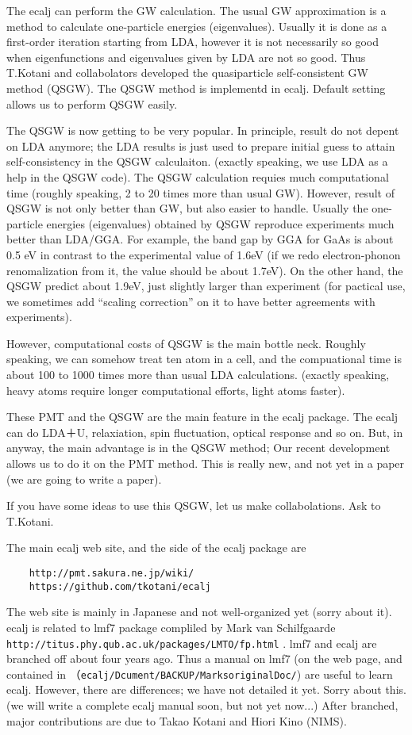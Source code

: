 \documentclass[a4paper,10pt,epsf,fleqn]{article}
\begin{document}
The ecalj can perform the GW calculation. 
The usual GW approximation is a method to calculate
one-particle energies (eigenvalues). Usually it is done as a
first-order iteration starting from LDA, however it is not necessarily
so good when eigenfunctions and eigenvalues given by LDA are not
so good. Thus T.Kotani and collabolators developed the 
quasiparticle self-consistent GW method (QSGW). The QSGW method is
implementd in ecalj. Default setting allows us to perform QSGW easily.

The QSGW is now getting to be very popular. In principle,
result do not depent on LDA anymore; the LDA results is just used to
prepare initial guess to attain
self-consistency in the QSGW calculaiton. (exactly speaking, we use
LDA as a help in the QSGW code). 
The QSGW calculation requies much computational time 
(roughly speaking, 2 to 20 times more than usual GW).
However, result of QSGW is not only better than GW, but also easier to handle.
Usually the one-particle energies (eigenvalues) obtained by QSGW
reproduce experiments much better than LDA/GGA.
For example, the band gap by GGA for GaAs is about 0.5 eV in contrast
to the experimental value of 1.6eV (if we redo electron-phonon
renomalization from it, the value should be about 1.7eV). 
On the other hand, the QSGW predict about 1.9eV, just slightly larger
than experiment (for pactical use, we sometimes add 
``scaling correction'' on it to have better agreements with experiments).

However, computational costs of QSGW is the main bottle neck. 
Roughly speaking, we can somehow treat ten atom in a cell, and the compuational time
is about 100 to 1000 times more than usual LDA calculations.
(exactly speaking, heavy atoms require longer computational efforts,
light atoms faster).

These PMT and the QSGW are the main feature in the ecalj package.
The ecalj can do LDA＋U, relaxiation, spin fluctuation, optical response and so on.
But, in anyway, the main advantage is in the QSGW method; Our recent
development  allows us to do it on the PMT method. 
This is really new, and not yet in a paper (we are going to write a
paper).

If you have some ideas to use this QSGW, let us make
collabolations. Ask to T.Kotani.

The main ecalj web site, and the side of the ecalj package are
\begin{verbatim}
    http://pmt.sakura.ne.jp/wiki/
    https://github.com/tkotani/ecalj
\end{verbatim}
The web site is mainly in Japanese and not well-organized yet (sorry
about it). ecalj is related to lmf7 package compliled by Mark van Schilfgaarde\\
\verb+http://titus.phy.qub.ac.uk/packages/LMTO/fp.html+
. lmf7 and ecalj are branched off about four years ago.
Thus a manual on lmf7 (on the web page, and contained in 
（\verb+ecalj/Dcument/BACKUP/MarksoriginalDoc/+)
are useful to learn ecalj. However, there are differences;
we have not detailed it yet. Sorry about this. 
(we will write a complete ecalj manual soon, but not yet now...)
After branched, major contributions are due to Takao Kotani and Hiori Kino (NIMS).
\end{document}
